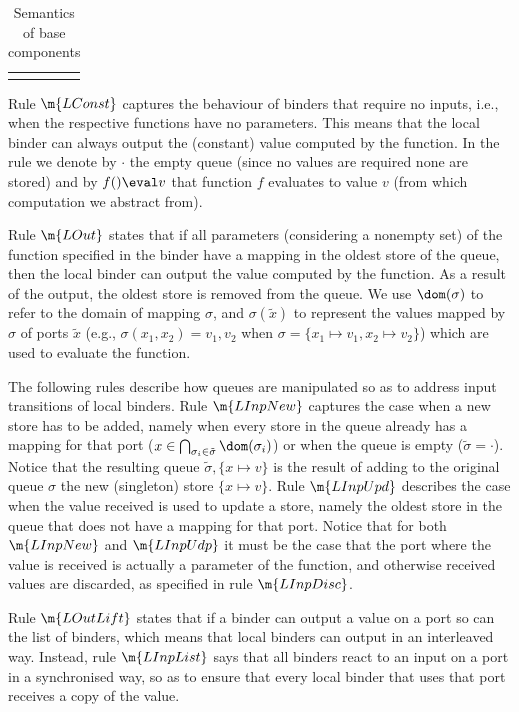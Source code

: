 \begin{itemize}
\begin{table}[t]
\begin{tabular} {c c c}
	& & \\
\end{tabular}
  \caption{Semantics of base components}
  \label{tab:gc_semantics_base}
\end{table}


Rule $\m{LConst}$ captures the behaviour of binders that require no inputs, i.e., when the respective functions have no parameters. This means that the local binder can
always output the (constant) value computed by the function. In the rule we denote by $\cdot$ the empty queue (since no values are required none are stored)
and by $f() \eval v$ that function $f$ evaluates to value $v$ (from which computation we abstract from).

Rule $\m{LOut}$ states that if all parameters (considering a nonempty set) of the function specified in the binder have a mapping in the oldest store of
the queue, then the local binder can output the value computed by the function. As a result of the output, the oldest store is removed from the queue.
We use $ \dom(\sigma)$ to refer to the domain of mapping $\sigma$, and $\sigma(\tilde x)$ to represent the values mapped by $\sigma$ of ports $\tilde x$ 
(e.g., $\sigma(x_1, x_2) = v_1, v_2$ when $\sigma = \{x_1 \mapsto v_1, x_2 \mapsto v_2\}$) which are used to evaluate the function.

The following rules describe how queues are manipulated so as to address input transitions of local binders. 
Rule $\m{LInpNew}$ captures the case when a new store has to be added, namely when every store in the queue already has a mapping 
for that port ($x \in \bigcap_{\sigma_i \in \tilde \sigma}\dom(\sigma_i)$)  or when the queue is empty ($\tilde \sigma = \cdot$).
Notice that the resulting queue $\tilde{\sigma},\{x \mapsto v\}$ is the result of adding to the original queue $\sigma$ the new (singleton) store $\{x \mapsto v\}$.
%
Rule $\m{LInpUpd}$ describes the case when the value received is used to update a store, namely the oldest store in the queue  that does not have a mapping for that port.
%
Notice that for both $\m{LInpNew}$ and $\m{LInpUdp}$ it must be the case that the port where the value is received is actually a parameter of the function, and
otherwise received values are discarded, as specified in rule $\m{LInpDisc}$.

Rule $\m{LOutLift}$ states that if a binder can output a value on a port so can the list of binders, which means that local binders can output in an interleaved way.
Instead, rule $\m{LInpList}$ says that all binders react to an input on a port in a synchronised way, so as to ensure that every local binder that uses that port receives a copy of the value.


\end{itemize}
